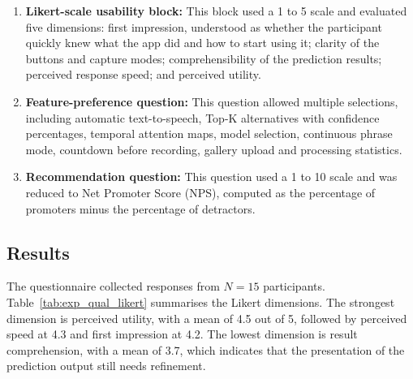 \begin{enumerate}[1.]
    \item \textbf{Likert-scale usability block:} This block used a 1 to 5 scale and evaluated five
          dimensions: first impression, understood as whether the participant quickly knew what the app
          did and how to start using it; clarity of the buttons and capture modes; comprehensibility of
          the prediction results; perceived response speed; and perceived utility.

    \item \textbf{Feature-preference question:} This question allowed multiple selections, including
          automatic text-to-speech, Top-K alternatives with confidence percentages, temporal attention
          maps, model selection, continuous phrase mode, countdown before recording, gallery upload and
          processing statistics.

    \item \textbf{Recommendation question:} This question used a 1 to 10 scale and was reduced to
          Net Promoter Score (NPS), computed as the percentage of promoters minus the percentage of
          detractors.
\end{enumerate}

\subsection{Results}
\label{subsec:exp_qual_results}

The questionnaire collected responses from $N=15$ participants. Table~\ref{tab:exp_qual_likert}
summarises the Likert dimensions. The strongest dimension is perceived utility, with a mean of 4.5
out of 5, followed by perceived speed at 4.3 and first impression at 4.2. The lowest dimension is
result comprehension, with a mean of 3.7, which indicates that the presentation of the prediction
output still needs refinement.

